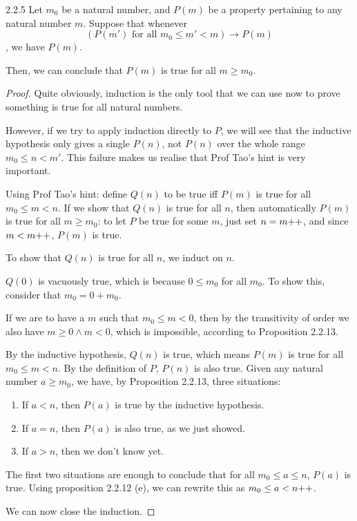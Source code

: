 \begin{exercise}{2.2.5}
Let $m_0$ be a natural number, and $P(m)$ be a property pertaining to any natural number $m$. Suppose that whenever
$$
(P(m') \text{ for all } m_0 \le m' < m) \to P(m)
$$
, we have $P(m)$.

Then, we can conclude that $P(m)$ is true for all $m \ge m_0$.
\end{exercise}
\begin{proof}
Quite obviously, induction is the only tool that we can use now to prove something is true for all natural numbers. 

However, if we try to apply induction directly to $P$, we will see that the inductive hypothesis only gives a single $P(n)$, not $P(n)$ over the whole range $m_0 \le n < m'$. This failure makes us realise that Prof Tao's hint is very important.

Using Prof Tao's hint: define $Q(n)$ to be true iff $P(m)$ is true for all $m_0 \le m < n$. If we show that $Q(n)$ is true for all $n$, then automatically $P(m)$ is true for all $m \ge m_0$: to let $P$ be true for some $m$, just set $n=m{+}{+}$, and since $m < m{+}{+}$, $P(m)$ is true.

To show that $Q(n)$ is true for all $n$, we induct on $n$.

\mybcbox 
$Q(0)$ is vacuously true, which is because $0 \le m_0$ for all $m_0$. To show this, consider that $m_0 = 0 + m_0$.

If we are to have a $m$ such that $m_0 \le m < 0$, then by the transitivity of order we also have $m \ge 0 \wedge m < 0$, which is impossible, according to Proposition 2.2.13.

\myisbox 
By the inductive hypothesis, $Q(n)$ is true, which means $P(m)$ is true for all $m_0 \le m < n$. By the definition of $P$, $P(n)$ is also true. Given any natural number $a \ge m_0$, we have, by Proposition 2.2.13, three situations:
\begin{enumerate}
	\item If $a < n$, then $P(a)$ is true by the inductive hypothesis.
	\item If $a = n$, then $P(a)$ is also true, as we just showed.
	\item If $a > n$, then we don't know yet.
\end{enumerate}
The first two situations are enough to conclude that for all $m_0 \le a \le n$, $P(a)$ is true. Using proposition 2.2.12 (e), we can rewrite this as $m_0 \le a < n{+}{+}$. 

We can now close the induction.
\end{proof}

